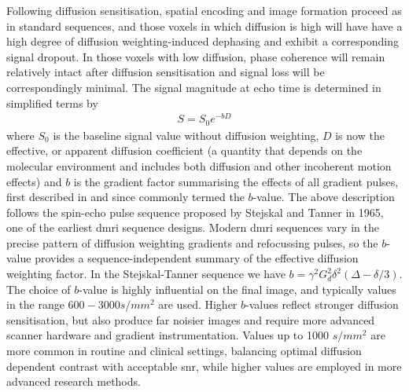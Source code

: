 Following diffusion sensitisation, spatial encoding and image formation proceed as in standard sequences, and those voxels in which diffusion is high will have have a high degree of diffusion weighting-induced dephasing and exhibit a corresponding signal dropout.
In those voxels with low diffusion, phase coherence will remain relatively intact after diffusion sensitisation and signal loss will be correspondingly minimal.
The signal magnitude at echo time is determined in simplified terms by
\begin{align}
    S = S_0e^{-bD}
\end{align}\label{eq:S}
where $S_0$ is the baseline signal value without diffusion weighting, $D$ is now the effective, or apparent diffusion coefficient\autocite{Basser1994,Beaulieu2002} (a quantity that depends on the molecular environment and includes both diffusion and other incoherent motion effects) and $b$ is the gradient factor summarising the effects of all gradient pulses, first described in \textcite{LeBihan1986} and since commonly termed the $b$-value.
The above description follows the spin-echo pulse sequence proposed by Stejskal and Tanner in 1965\autocite{Stejskal1965}, one of the earliest \gls{dmri} sequence designs.
Modern \gls{dmri} sequences vary in the precise pattern of diffusion weighting gradients and refocussing pulses, so the $b$-value provides a sequence-independent summary of the effective diffusion weighting factor.
In the Stejskal-Tanner sequence we have $b = \gamma^2 G_d^2 \delta^2 (\Delta-\delta/3)$.
The choice of $b$-value is highly influential on the final image, and typically values in the range $600-3000 s/mm^2$ are used.
Higher $b$-values reflect stronger diffusion sensitisation, but also produce far noisier images and require more advanced scanner hardware and gradient instrumentation.
Values up to 1000 $s/mm^2$ are more common in routine and clinical settings, balancing optimal diffusion dependent contrast with acceptable \gls{snr}, while higher values are employed  in more advanced research methods.\autocite{Roberts2007}  

